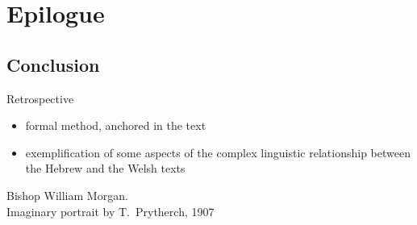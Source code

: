 \section{Epilogue}

\subsection{Conclusion}

\begin{frame}{Retrospective}
	\begin{itemize}
		\item formal method, anchored in the text
		\item exemplification of some aspects of the complex linguistic relationship between the Hebrew and the Welsh texts
	\end{itemize}
\end{frame}



\begin{frame}{}
	\begin{center}

		\vfill

		Bishop William Morgan.\\
		Imaginary portrait by T.\ Prytherch, 1907
	\end{center}
\end{frame}
